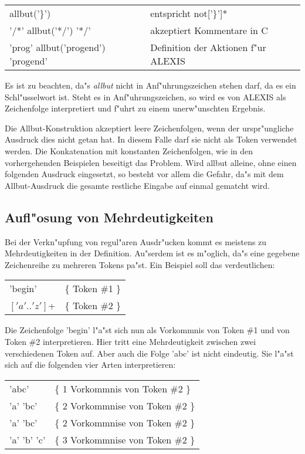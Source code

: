 \begin{tabular}{ll}
allbut('\}')&entspricht not['\}']*\\
'/*' allbut('*/') '*/'&akzeptiert Kommentare in C\\
'prog' allbut('progend') 'progend'&Definition der Aktionen f"ur ALEXIS\\
\end{tabular}

\medskip

Es ist zu beachten, da"s {\it allbut\/} nicht in Anf"uhrungszeichen stehen darf, da es ein
Schl"usselwort ist. Steht es in Anf"uhrungszeichen, so wird es von ALEXIS als
Zeichenfolge interpretiert und f"uhrt zu einem unerw"unschten Ergebnis.

Die Allbut-Konstruktion akzeptiert leere Zeichenfolgen, wenn der urspr"ungliche
Ausdruck dies nicht getan hat. In diesem Falle darf sie nicht als Token verwendet
werden. Die Konkatenation mit konstanten Zeichenfolgen, wie in den vorhergehenden
Beispielen beseitigt das Problem. Wird allbut alleine, ohne einen folgenden Ausdruck
eingesetzt, so besteht vor allem die Gefahr, da"s mit dem Allbut-Ausdruck die gesamte
restliche Eingabe auf einmal gematcht wird.
\subsection{Aufl"osung von Mehrdeutigkeiten}
Bei der Verkn"upfung von regul"aren Ausdr"ucken kommt es meistens zu Mehrdeutigkeiten
in der Definition. Au"serdem ist es m"oglich, da"s eine gegebene Zeichenreihe zu
mehreren Tokens pa"st. Ein Beispiel soll das verdeutlichen:

\medskip

\begin{tabular}{ll}
'begin'&\{ Token \#1 \}\\
$['a'..'z']$+&\{ Token \#2 \}\\
\end{tabular}

\medskip

Die Zeichenfolge 'begin' l"a"st sich nun als Vorkommnis von Token \#1 und von Token
\#2 interpretieren. Hier tritt eine Mehrdeutigkeit zwischen zwei verschiedenen Token
auf.
\vfill \eject
Aber auch die Folge 'abc' ist nicht eindeutig. Sie l"a"st sich auf die folgenden
vier Arten interpretieren:

\medskip

\begin{tabular}{ll}
'abc'&\{ 1 Vorkommnis  von Token \#2 \}\\
'a' 'bc'&\{ 2 Vorkommnise von Token \#2 \}\\
'a' 'bc'&\{ 2 Vorkommnise von Token \#2 \}\\
'a' 'b' 'c'&\{ 3 Vorkommnise von Token \#2 \}\\
\end{tabular}

